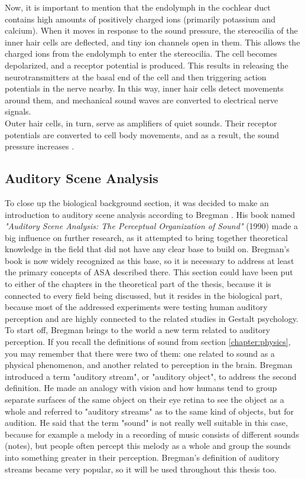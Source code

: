 Now, it is important to mention that the endolymph in the cochlear duct contains high amounts of positively charged ions (primarily potassium and calcium). When it moves in response to the sound pressure, the stereocilia of the inner hair cells are deflected, and tiny ion channels open in them. This allows the charged ions from the endolymph to enter the stereocilia. The cell becomes depolarized, and a receptor potential is produced. This results in releasing the neurotransmitters at the basal end of the cell and then triggering action potentials in the nerve nearby. In this way, inner hair cells detect movements around them, and mechanical sound waves are converted to electrical nerve signals.\\

Outer hair cells, in turn, serve as amplifiers of quiet sounds. Their receptor potentials are converted to cell body movements, and as a result, the sound pressure increases \cite{Hudspeth2008}.

\subsection{Auditory Scene Analysis}\label{section:biology_asa}

To close up the biological background section, it was decided to make an introduction to auditory scene analysis according to Bregman \cite{Bregman1990}. His book named \textit{"Auditory Scene Analysis: The Perceptual Organization of Sound"} (1990) made a big influence on further research, as it attempted to bring together theoretical knowledge in the field that did not have any clear base to build on. Bregman's book is now widely recognized as this base, so it is necessary to address at least the primary concepts of ASA described there. This section could have been put to either of the chapters in the theoretical part of the thesis, because it is connected to every field being discussed, but it resides in the biological part, because most of the addressed experiments were testing human auditory perception and are highly connected to the related studies in Gestalt psychology.\\

To start off, Bregman brings to the world a new term related to auditory perception. If you recall the definitions of sound from section \ref{chapter:physics}, you may remember that there were two of them: one related to sound as a physical phenomenon, and another related to perception in the brain. Bregman introduced a term "auditory stream", or "auditory object", to address the second definition. He made an analogy with vision and how humans tend to group separate surfaces of the same object on their eye retina to see the object as a whole and referred to "auditory streams" as to the same kind of objects, but for audition. He said that the term "sound" is not really well suitable in this case, because for example a melody in a recording of music consists of different sounds (notes), but people often percept this melody as a whole and group the sounds into something greater in their perception. Bregman's definition of auditory streams became very popular, so it will be used throughout this thesis too.\\

